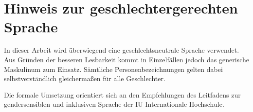 
\chapter*{Hinweis zur geschlechtergerechten Sprache}

\noindent
In dieser Arbeit wird überwiegend eine geschlechtsneutrale Sprache verwendet. Aus Gründen der besseren Lesbarkeit kommt in Einzelfällen jedoch das generische Maskulinum zum Einsatz. Sämtliche Personenbezeichnungen gelten dabei selbstverständlich gleichermaßen für alle Geschlechter. 

\noindent
Die formale Umsetzung orientiert sich an den Empfehlungen des Leitfadens zur gendersensiblen und inklusiven Sprache der IU Internationale Hochschule.